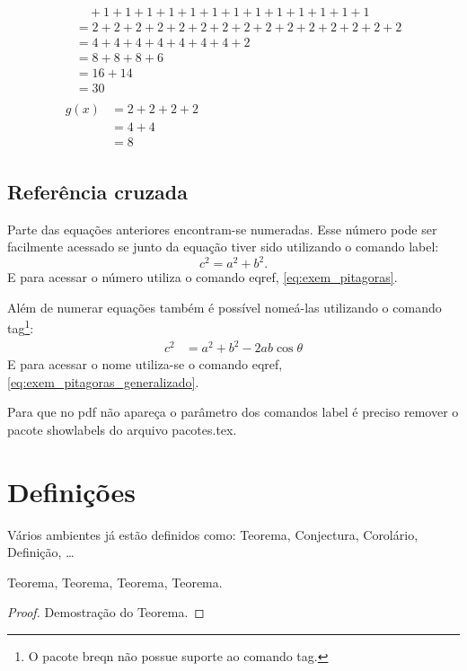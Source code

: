 \begin{description}
\begin{align}
\begin{split}
        &\quad {}+ 1 + 1 + 1 + 1 + 1 + 1 + 1 + 1 + 1 + 1 + 1 + 1 + 1 \\
        &= 2 + 2 + 2 + 2 + 2 + 2 + 2 + 2 + 2 + 2 + 2 + 2 + 2 + 2 + 2 \\
        &= 4 + 4 + 4 + 4 + 4 + 4 + 4 + 2 \\
        &= 8 + 8 + 8 + 6 \\
        &= 16 + 14 \\
        &= 30
      \end{split} \\
      \begin{split}
        g(x) &= 2 + 2 + 2 + 2 \\
        &= 4 + 4 \\
        &= 8
      \end{split}
    \end{align}
\end{description}

\subsection{Referência cruzada}
Parte das equações anteriores encontram-se numeradas. Esse número pode ser
facilmente acessado se junto da equação tiver sido utilizando o comando label:
\begin{dmath}
  c^2 = a^2 + b^2. \label{eq:exem_pitagoras}
\end{dmath}
E para acessar o número utiliza o comando eqref, \eqref{eq:exem_pitagoras}.

Além de numerar equações também é possível nomeá-las utilizando o comando
tag\footnote{O pacote breqn não possue suporte ao comando tag.}:
\begin{align}
  c^2 &= a^2 + b^2 - 2 a b \cos\theta 
  \label{eq:exem_pitagoras_generalizado}
  \tag{GTP}
\end{align}
E para acessar o nome utiliza-se o comando eqref,
\eqref{eq:exem_pitagoras_generalizado}.

Para que no pdf não apareça o parâmetro dos comandos label é preciso remover o
pacote showlabels do arquivo pacotes.tex.

\section{Definições}
Vários ambientes já estão definidos como: Teorema, Conjectura, Corolário,
Definição, \ldots

\begin{thm}
  Teorema, Teorema, Teorema, Teorema.
\end{thm}
\begin{proof}
  Demostração do Teorema.
\end{proof}

